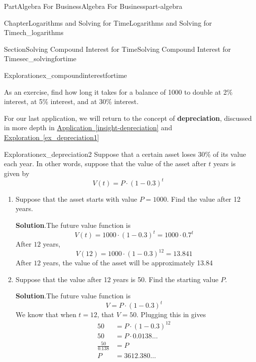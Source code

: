 \documentclass[oneside,10pt,]{tufte-book}
\newcommand{\blocktitlefont}{\relax}
\newcommand{\xreffont}{\relax}
\newcommand{\terminology}[1]{\textbf{#1}}
\numberwithin{equation}{chapter}
\newcommand{\amp}{&}
\begin{document}
\begin{partptx}{Part}{Algebra For Business}{}{Algebra For Business}{}{}{part-algebra}
\begin{chapterptx}{Chapter}{Logarithms and Solving for Time}{}{Logarithms and Solving for Time}{}{}{ch_logarithms}
\begin{sectionptx}{Section}{Solving Compound Interest for Time}{}{Solving Compound Interest for Time}{}{}{sec_solvingfortime}
\begin{exploration}{Exploration}{}{ex_compoundinterestfortime}
\begin{enumerate}[font=\bfseries,label=(\alph*),ref=\alph*]
\end{enumerate}%
\end{exploration}%
As an exercise, find how long it takes for a balance of \textdollar{}1000 to double at 2\% interest, at 5\% interest, and at 30\% interest.%
\par
For our last application, we will return to the concept of \terminology{depreciation}, discussed in more depth in \hyperref[insight-depreciation]{Application~{\xreffont\ref{insight-depreciation}}} and \hyperref[ex_depreciation1]{Exploration~{\xreffont\ref{ex_depreciation1}}}%
\begin{exploration}{Exploration}{}{ex_depreciation2}%
Suppose that a certain asset loses 30\% of its value each year. In other words, suppose that the value of the asset after \(t\) years is given by%
\begin{equation*}
V(t) = P\cdot (1-0.3)^t
\end{equation*}
%
\begin{enumerate}[font=\bfseries,label=(\alph*),ref=\alph*]%
\item{}Suppose that  the asset starts with value \(P=1000\). Find the value after 12 years.%
\par\smallskip%
\noindent\textbf{\blocktitlefont Solution}.\hypertarget{ex_depreciation2-2-2}{}\quad{}The future value function is%
\begin{equation*}
V(t) = 1000 \cdot (1-0.3)^t = 1000\cdot 0.7^t
\end{equation*}
After \(12\) years,%
\begin{equation*}
V(12) = 1000 \cdot (1-0.3)^{12} = 13.841
\end{equation*}
After \(12\) years, the value of the asset will be approximately \textdollar{}13.84%
\item{}Suppose that the value after 12 years is \textdollar{}50.  Find the starting value \(P\).%
\par\smallskip%
\noindent\textbf{\blocktitlefont Solution}.\hypertarget{ex_depreciation2-3-2}{}\quad{}The future value function is%
\begin{equation*}
V = P \cdot (1-0.3)^t 
\end{equation*}
We know that when \(t=12\), that \(V=50\).  Plugging this in gives%
\begin{align*}
50 \amp = P \cdot (1-0.3)^{12}\\
50 \amp = P \cdot 0.0138\dots\\
\frac{50}{0.138} \amp = P\\
P \amp = 3612.380\dots
\end{align*}

\end{enumerate}
\end{exploration}
\end{sectionptx}
\end{chapterptx}
\end{partptx}
\end{document}
